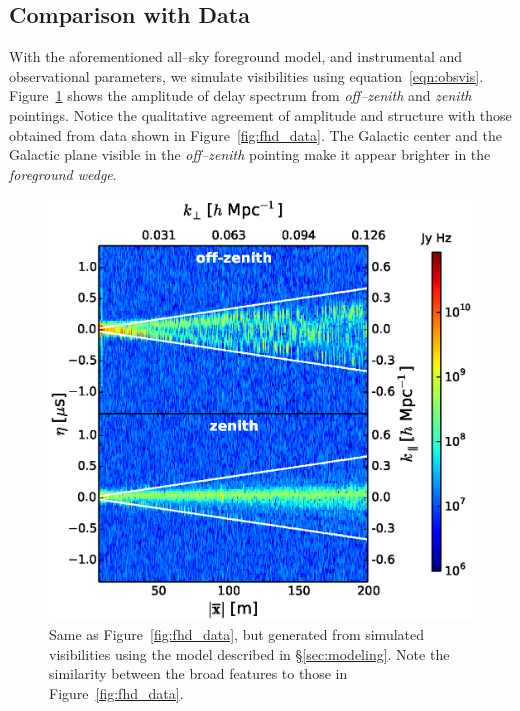\documentclass[preprint2,iop,numberedappendix]{emulateapj}
\begin{document}
\subsection{Comparison with Data}\label{sec:data-vs-model}

With the aforementioned all--sky foreground model, and instrumental and observational parameters, we simulate visibilities using equation~\ref{eqn:obsvis}. Figure~\ref{fig:sim_data} shows the amplitude of delay spectrum from {\it off--zenith} and {\it zenith} pointings. Notice the qualitative agreement of amplitude and structure with those obtained from data shown in Figure~\ref{fig:fhd_data}. The Galactic center and the Galactic plane visible in the {\it off--zenith} pointing make it appear brighter in the {\it foreground wedge}. 

\begin{figure}[htb]
\centering
\includegraphics[width=\linewidth]{figures/v1_0/multi_baseline_sim_delay_spectrum_snapshots.eps}
\caption{Same as Figure~\ref{fig:fhd_data}, but generated from simulated visibilities using the model described in \S\ref{sec:modeling}. Note the similarity between the broad features to those in Figure~\ref{fig:fhd_data}. \label{fig:sim_data}}
\end{figure}
\end{document}
